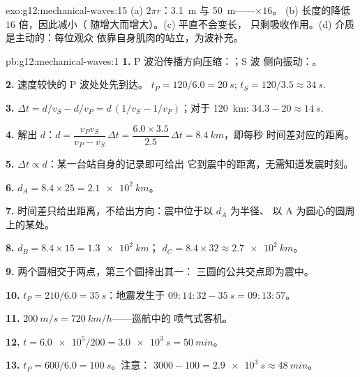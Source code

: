 \begin{solution}{exo:g12:mechanical-waves:15}
(a) $2\pi r$：\qty{3.1}{m} 与 \qty{50}{m}——$\times 16$。
(b) 长度的降低 $16$ 倍，因此减小（
随增大而增大）。(c) 平直不会变长，
只剩吸收作用。(d) 介质是主动的：每位观众
依靠自身肌肉的站立，为波补充。
\end{solution}

\begin{solution}{pb:g12:mechanical-waves:1}
\textbf{1.} P 波沿传播方向压缩：；S 波
侧向振动：。

\textbf{2.} 速度较快的 P 波处处先到达。
$t_P = 120/6.0 = \qty{20}{s}$; $t_S = 120/3.5 \approx \qty{34}{s}$.

\textbf{3.} $\Delta t = d/v_S - d/v_P = d\,(1/v_S - 1/v_P)$；对于
\qty{120}{km}: $34.3 - 20 \approx \qty{14}{s}$.

\textbf{4.} 解出 $d$：$d = \dfrac{v_P v_S}{v_P - v_S}\,\Delta t
= \dfrac{6.0 \times 3.5}{2.5}\,\Delta t = \qty{8.4}{km}$，即每秒
时间差对应的距离。

\textbf{5.} $\Delta t \propto d$：某一台站自身的记录即可给出
它到震中的距离，无需知道发震时刻。

\textbf{6.} $d_A = 8.4 \times 25 = \qty{2.1e2}{km}$。

\textbf{7.} 时间差只给出距离，不给出方向：震中位于以 $d_A$ 为半径、
以 A 为圆心的圆周上的某处。

\textbf{8.} $d_B = 8.4 \times 15 = \qty{1.3e2}{km}$；
$d_C = 8.4 \times 32 \approx \qty{2.7e2}{km}$。

\textbf{9.} 两个圆相交于两点，第三个圆择出其一：
三圆的公共交点即为震中。

\textbf{10.} $t_P = 210/6.0 = \qty{35}{s}$：地震发生于
$09{:}14{:}32 - \qty{35}{s} = 09{:}13{:}57$。

\textbf{11.} $\qty{200}{m/s} = \qty{720}{km/h}$——巡航中的
喷气式客机。

\textbf{12.} $t = \num{6.0e5}/200 = \qty{3.0e3}{s} = \qty{50}{min}$。

\textbf{13.} $t_P = 600/6.0 = \qty{100}{s}$。注意：
$3000 - 100 = \qty{2.9e3}{s} \approx \qty{48}{min}$。


\end{solution}
